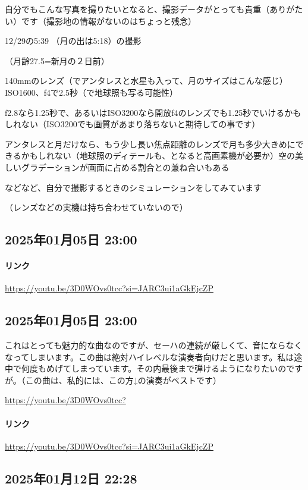 自分でもこんな写真を撮りたいとなると、撮影データがとっても貴重（ありがたい）です（撮影地の情報がないのはちょっと残念）

12/29の5:39 （月の出は5:18）の撮影

（月齢27.5=新月の２日前）

140mmのレンズ（でアンタレスと水星も入って、月のサイズはこんな感じ）ISO1600、f4で2.5秒（で地球照も写る可能性）

f2.8なら1.25秒で、あるいはISO3200なら開放f4のレンズでも1.25秒でいけるかもしれない（ISO3200でも画質があまり落ちないと期待しての事です）

アンタレスと月だけなら、もう少し長い焦点距離のレンズで月も多少大きめにできるかもしれない（地球照のディテールも、となると高画素機が必要か）空の美しいグラデーションが画面に占める割合との兼ね合いもある

などなど、自分で撮影するときのシミュレーションをしてみています

（レンズなどの実機は持ち合わせていないので）

\subsection*{2025年01月05日 23:00}

\paragraph{リンク}
\url{https://youtu.be/3D0WOvs0tcc?si=JARC3ui1aGkEjcZP}

\subsection*{2025年01月05日 23:00}

これはとっても魅力的な曲なのですが、セーハの連続が厳しくて、音にならなくなってしまいます。この曲は絶対ハイレベルな演奏者向けだと思います。私は途中で何度もめげてしまっています。その内最後まで弾けるようになりたいのですが。（この曲は、私的には、この方↓の演奏がベストです）

\url{https://youtu.be/3D0WOvs0tcc?}

\paragraph{リンク}
\url{https://youtu.be/3D0WOvs0tcc?si=JARC3ui1aGkEjcZP}

\subsection*{2025年01月12日 22:28}

